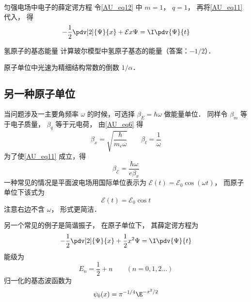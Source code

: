 \begin{example}{匀强电场中电子的薛定谔方程}
令\autoref{AU_eq12} 中 $m = 1$， $q = 1$， 再将\autoref{AU_eq11} 代入， 得
\begin{equation}
-\frac12 \pdv[2]{\Psi}{x} + \mathcal{E} x \Psi= \I\pdv{\Psi}{t}
\end{equation}
\end{example}

\begin{exercise}{氢原子的基态能量}
计算玻尔模型中氢原子基态的能量（答案：$-1/2$）．
\end{exercise}

原子单位中光速为精细结构常数的倒数 $1/\alpha$．

\subsection{另一种原子单位}

当问题涉及一主要角频率 $\omega$ 的时候，可选择 $\beta_E = \hbar\omega$ 做能量单位． 同样令 $\beta_m$ 等于电子质量， $\beta_q$ 等于元电荷， 由\autoref{AU_eq6} 得
\begin{equation}\label{AU_eq15}
\beta_x = \sqrt{\frac{\hbar}{m_e\omega}}
\qquad
\beta_t = \frac{1}{\omega}
\end{equation}
为了使\autoref{AU_eq11} 成立，得
\begin{equation}
\beta_\mathcal{E} = \frac{\hbar\omega}{e \beta_x}
\end{equation}
一种常见的情况是平面波电场用国际单位表示为 $\mathcal{E}(t) = \mathcal{E}_0\cos(\omega t)$， 而原子单位下该式为
\begin{equation}
\mathcal{E}(t) = \mathcal{E}_0\cos t
\end{equation}
注意右边不含 $\omega$， 形式更简洁．

另一个常见的例子是简谐振子， 在原子单位下， 其薛定谔方程为
\begin{equation}\label{AU_eq18}
-\frac12 \pdv[2]{\Psi}{x} + \frac12 x^2 \Psi= \I\pdv{\Psi}{t}
\end{equation}
能级为
\begin{equation}\label{AU_eq19}
E_n = \frac12 + n \qquad (n = 0, 1, 2\dots)
\end{equation}
归一化的基态波函数为
\begin{equation}
\psi_0(x) = \pi^{-1/4} \E^{-x^2/2}
\end{equation}


